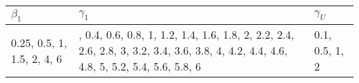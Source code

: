 
\begin{tabular}{l>{\raggedright\arraybackslash}p{1.5in}l}
\toprule
$\beta_1$ & $\gamma_1$ & $\gamma_U$\\
\midrule
0.25, 0.5, 1, 1.5, 2, 4, 6 & 0.2, 0.4, 0.6, 0.8, 1, 1.2, 1.4, 1.6, 1.8, 2, 2.2, 2.4, 2.6, 2.8, 3, 3.2, 3.4, 3.6, 3.8, 4, 4.2, 4.4, 4.6, 4.8, 5, 5.2, 5.4, 5.6, 5.8, 6 & 0.1, 0.5, 1, 2\\
\bottomrule
\end{tabular}